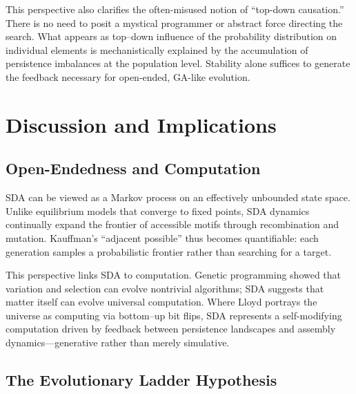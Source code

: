 \documentclass[life,article,submit,pdftex,moreauthors]{Definitions/mdpi}
\begin{document}
This perspective also clarifies the often-misused notion of “top-down causation.” There is no need to posit a mystical programmer or abstract force directing the search. What appears as top–down influence of the probability distribution on individual elements is mechanistically explained by the accumulation of persistence imbalances at the population level. Stability alone suffices to generate the feedback necessary for open-ended, GA-like evolution.



\section{Discussion and Implications}

\subsection{Open-Endedness and Computation}
SDA can be viewed as a Markov process on an effectively unbounded state space. 
Unlike equilibrium models that converge to fixed points, SDA dynamics continually expand the frontier of accessible motifs through recombination and mutation. 
Kauffman’s “adjacent possible” thus becomes quantifiable: each generation samples a probabilistic frontier rather than searching for a target.  

This perspective links SDA to computation. Genetic programming showed that variation and selection can evolve nontrivial algorithms; SDA suggests that matter itself can evolve universal computation. 
Where Lloyd portrays the universe as computing via bottom–up bit flips, SDA represents a self-modifying computation driven by feedback between persistence landscapes and assembly dynamics—generative rather than merely simulative.  

\subsection{The Evolutionary Ladder Hypothesis}  
\end{document}
